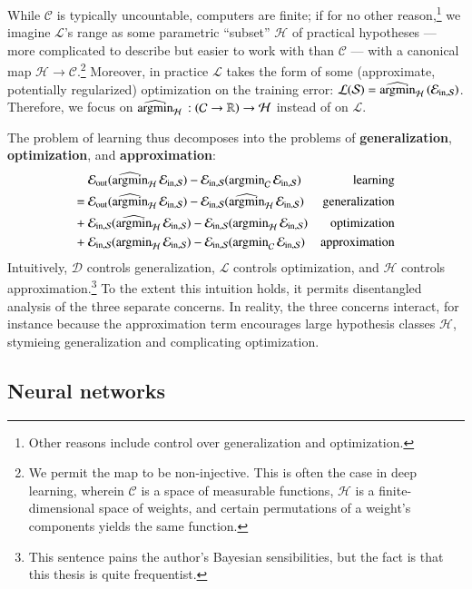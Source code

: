 \documentclass[openany, notitlepage, justified]{tufte-book}
\theoremstyle{plain}
\theoremstyle{definition}
\newcommand{\Cc}{\mathcal{C}}   \newcommand{\CC}{\mathbb{C}}
\newcommand{\Dd}{\mathcal{D}}
\newcommand{\Hh}{\mathcal{H}}
\newcommand{\Ll}{\mathcal{L}}
\newcommand{\Ss}{\mathcal{S}}
\begin{document}
        While $\Cc$ is typically uncountable, computers are finite; if for no
        other reason,\footnote{
            Other reasons include control over generalization and optimization.
        }
        we imagine $\Ll$'s range as some parametric ``subset'' $\Hh$ of
        practical hypotheses --- more complicated to describe but easier to
        work with than $\Cc$ ---  with a canonical map $\Hh \to \Cc$.\footnote{
            We permit the map to be non-injective.  This is often the case in
            deep learning, wherein $\Cc$ is a space of measurable functions,
            $\Hh$ is a finite-dimensional space of weights, and certain
            permutations of a weight's components yields the same function.
        } Moreover, in practice $\Ll$ takes the form of
        some (approximate, potentially regularized) optimization on the
        training error: $\Ll(\Ss) = \optH(\Ein)$.  Therefore, we focus on
        $\optH:(\Cc\to\RR)\to \Hh$ instead of on $\Ll$.

        The problem of learning thus decomposes into the problems of
        \textbf{generalization}, \textbf{optimization}, and
        \textbf{approximation}:
        \begin{align*}
             &~\Eout(\optH\Ein) - \Ein(\amC\Ein)    & \text{learning}       \\
            =&~\Eout(\optH\Ein) - \Ein(\optH\Ein)   & \text{generalization} \\ 
            +&~ \Ein(\optH\Ein) - \Ein(\amH\Ein)    & \text{optimization}   \\ 
            +&~ \Ein(\amH\Ein)  - \Ein(\amC\Ein)    & \text{approximation}    
        \end{align*}
           Intuitively,
            $\Dd$ controls generalization,
            $\Ll$ controls   optimization, 
        and $\Hh$ controls  approximation.\footnote{
            This sentence pains the author's Bayesian sensibilities, but the 
            fact is that this thesis is quite frequentist.
        } To the extent this intuition holds,
        it permits disentangled analysis of the three separate concerns.
        In reality, the three concerns interact, for instance because
        the approximation term encourages large hypothesis classes $\Hh$,
        stymieing generalization and complicating optimization. 

        \subsection{Neural networks}
\end{document}
